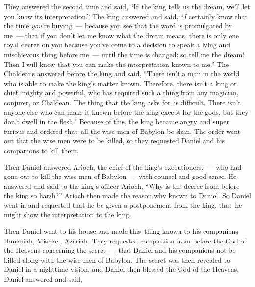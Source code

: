 \begin{inparaenum}
   They answered the second time and said, ``If\understood{}\ the king tells us the dream, we'll let you know its interpretation.''%
   The king answered and said, ``\emph{I} certainly know that the time \emph{you}'re buying~--- because you see that the word is promulgated by me~---%
   that if you don't let me know what the dream means\understood{}, there is only one royal decree on you because you've come to a decision to speak a lying and mischievous thing before me~--- until the time is changed: so tell me the dream! Then I will know that you can make the interpretation known to me.''%
   The Chaldeans answered before the king and said, ``There isn't a man in the world who is able to make the king's matter known. Therefore, there isn't a king or chief, mighty and powerful, who has required such a thing from any magician, conjurer, or Chaldean.%
   The thing that the king asks for\understood{}\ is difficult. There isn't anyone else who can make it known before the king except for the gods, but they don't dwell in the flesh.''%
   Because of this, the king became angry and super furious and ordered that\understood{}\ all the wise men of Babylon be slain.%
   The order went out that the wise men were to be killed, so they requested Daniel and his companions to kill them.%

   Then Daniel answered Arioch, the chief of the king's executioners,~--- who had gone out to kill the wise men of Babylon~--- with counsel and good sense.%
   He answered and said to the king's officer Arioch, ``Why is the decree from before the king so harsh?'' Arioch then made the reason why known to Daniel.%
   So Daniel went in and requested that he be given a postponement from the king, that\understood{}\ he might show the interpretation to the king.%

   Then Daniel went to his house and made this\understood{}\ thing known to his companions Hananiah, Mishael, Azariah.%
   They requested compassion from before the God of the Heavens concerning the secret~--- that Daniel and his companions not be killed along with the wise men of Babylon.%
   The secret was then revealed to Daniel in a nighttime vision, and Daniel then blessed the God of the Heavens.%
   Daniel answered and said,\smallskip%


\end{inparaenum}
